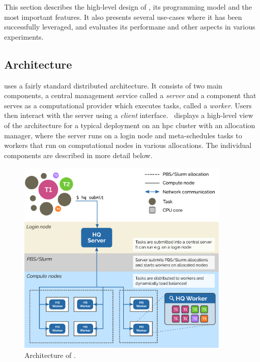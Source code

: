 This section describes the high-level design of \hyperqueue{}, its programming model and
the most important features. It also presents several use-cases where it has been successfully
leveraged, and evaluates its performane and other aspects in various experiments.


\subsection{Architecture}
\hyperqueue{} uses a fairly standard distributed architecture. It consists of two main
components, a central management service called a \emph{server} and a component that
serves as a computational provider which executes tasks, called a \emph{worker}. Users
then interact with the server using a \emph{client} interface.~
displays a high-level view of the \hq{} architecture for a typical deployment on
an \gls{hpc} cluster with an allocation manager, where the server runs on a login
node and meta-schedules tasks to workers that run on computational nodes in various allocations.
The individual components are described in more detail below.

\begin{figure}[h]
	\centering
	\includegraphics[width=0.9\textwidth]{imgs/hq/architecture}
	\caption{Architecture of \hyperqueue{}.}
	\label{fig:hq-architecture}
\end{figure}

